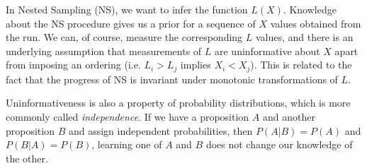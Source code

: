 \documentclass[a4paper, 11pt]{article}
\title{}
\author{}
\begin{document}
\maketitle

In Nested Sampling (NS), we want to infer the function $L(X)$.
Knowledge about the NS procedure gives us a prior for a sequence of $X$ values
obtained from the run. We can, of course, measure the corresponding $L$
values, and there is an underlying assumption that measurements of $L$ are
uninformative about $X$ apart from imposing an ordering
(i.e. $L_i > L_j$ implies $X_i < X_j$). This is related to the fact that the
progress of NS is invariant under monotonic transformations of $L$.

Uninformativeness is also a property of probability distributions, which
is more commonly called {\it independence}. If we have a proposition $A$ and
another proposition $B$ and assign independent probabilities, then
$P(A|B) = P(A)$ and $P(B|A) = P(B)$, learning one of $A$ and $B$
does not change our knowledge of the other.
\end{document}
